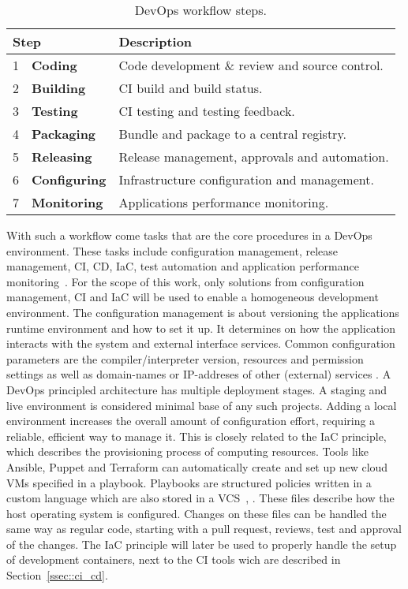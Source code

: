 \documentclass[12pt, a4paper]{article}
\begin{document}
        \begin{table}[!h]
            \centering
            \begin{tabularx}{0.85\textwidth}{llX}
                \multicolumn{2}{l}{Step} & Description \\ \hline\hline
                1 & \textbf{Coding}& Code development \& review and source control.  \\
                2 & \textbf{Building}& \acs{CI} build and build status.  \\
                3 & \textbf{Testing}& \acs{CI} testing and testing feedback.  \\
                4 & \textbf{Packaging}& Bundle and package to a central registry.  \\
                5 & \textbf{Releasing}& Release management, approvals and automation.  \\
                6 & \textbf{Configuring}& Infrastructure configuration and management.  \\
                7 & \textbf{Monitoring}& Applications performance monitoring.  \\
            \end{tabularx}
            \caption{DevOps workflow steps.}
            \label{tab::devops_steps}
        \end{table}

        \noindent With such a workflow come tasks that are the core procedures in a DevOps environment. These tasks include configuration management, release management, \ac{CI}, \ac{CD}, \ac{IaC}, test automation and application performance monitoring~\cite{azuredevops}.\newline
        For the scope of this work, only solutions from configuration management, \ac{CI} and \ac{IaC} will be used to enable a homogeneous development environment. The configuration management is about versioning the applications runtime environment and how to set it up. It determines on how the application interacts with the system and external interface services. Common configuration parameters are the compiler/interpreter version, resources and permission settings as well as domain-names or \acs{IP}-addreses of other (external) services \cite{base_devops}. A DevOps principled architecture has multiple deployment stages. A staging and live environment is considered minimal base of any such projects. Adding a local environment increases the overall amount of configuration effort, requiring a reliable, efficient way to manage it. This is closely related to the \ac{IaC} principle, which describes the provisioning process of computing resources. Tools like Ansible, Puppet and Terraform can automatically create and set up new cloud \ac{VM}s specified in a playbook. Playbooks are structured policies written in a custom language which are also stored in a \ac{VCS}~\cite{ansible2020}, \cite{azuredevops}. These files describe how the host operating system is configured. Changes on these files can be handled the same way as regular code, starting with a pull request, reviews, test and approval of the changes. The \acl{IaC} principle will later be used to properly handle the setup of development containers, next to the \acs{CI} tools wich are described in Section~\ref{ssec::ci_cd}.
\end{document}
